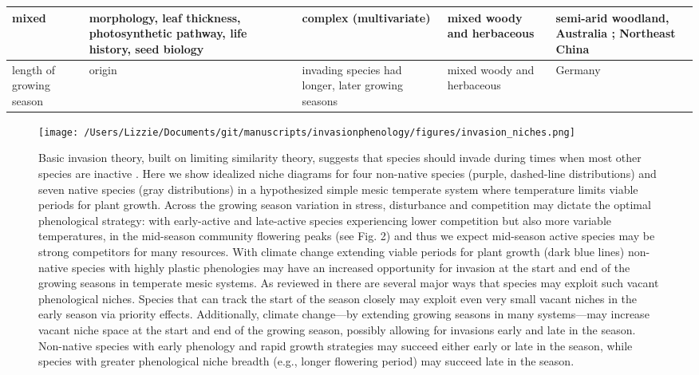 \documentclass[11pt,a4paper,oneside]{article}
\begin{document}
\begin{center}
\begin{table}
\begin{minipage}{16cm}
\begin{tabular}{ | p{2cm} |  p{2.5 cm} | p{2.5 cm} | p{2.5 cm} | p{5cm} | }
mixed & morphology, leaf thickness, photosynthetic pathway, life history, seed biology & complex (multivariate) & mixed woody and herbaceous & semi-arid woodland, Australia \citep{Leishman1992}; Northeast China \citep{Wang2005} \\ \hline
length of growing season & origin & invading species had longer, later growing seasons & mixed woody and herbaceous & Germany \citep{Kuester2010}\\ \hline \hline
\end{tabular}
\vspace{-0.75\skip\footins}
   \renewcommand{\footnoterule}{}
  \end{minipage}
\end{table}
\end{center}


\newpage
\noindent 
\begin{figure}[h!]
\centering
\noindent \texttt{[image: /Users/Lizzie/Documents/git/manuscripts/invasionphenology/figures/invasion\_niches.png]}
\caption{Basic invasion theory, built on limiting similarity theory, suggests that species should invade during times when most other species are inactive \citep[vacant phenological niche, see][]{wolkovich:2010fee}. Here we show idealized niche diagrams for four non-native species (purple, dashed-line distributions) and seven native species (gray distributions) in a hypothesized simple mesic temperate system where temperature limits viable periods for plant growth. Across the growing season variation in stress, disturbance and competition may dictate the optimal phenological strategy: with early-active and late-active species experiencing lower competition but also more variable temperatures, in the mid-season community flowering peaks (see Fig. 2) and thus we expect mid-season active species may be strong competitors for many resources.  With climate change extending viable periods for plant growth (dark blue lines) non-native species with highly plastic phenologies may have an increased opportunity for invasion at the start and end of the growing seasons in temperate mesic systems. As reviewed in \citet{wolkovich:2010fee} there are several major ways that species may exploit such vacant phenological niches. Species that can track the start of the season closely may exploit even very small vacant niches in the early season via priority effects. Additionally, climate change---by extending growing seasons in many systems---may increase vacant niche space at the start and end of the growing season, possibly allowing for invasions early and late in the season. Non-native species with early phenology and rapid growth strategies may succeed either early or late in the season, while species with greater phenological niche breadth (e.g., longer flowering period) may succeed late in the season.}
\end{figure}
\end{document}
